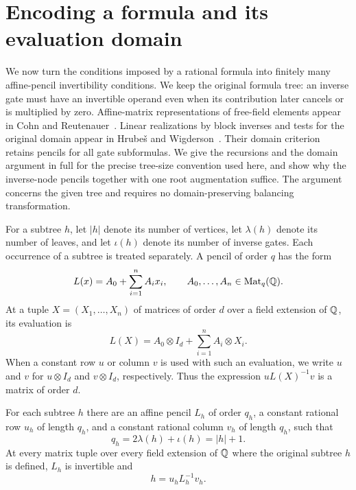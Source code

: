 \section{Encoding a formula and its evaluation domain}
\label{sec:encoding}

We now turn the conditions imposed by a rational formula into finitely many
affine-pencil invertibility conditions.  We keep the original formula tree:
an inverse gate must have an invertible operand even when its contribution
later cancels or is multiplied by zero.
Affine-matrix representations of free-field elements appear in
Cohn and Reutenauer~\citep[Section~3.1]{CR94}.
Linear realizations by block inverses and tests for the original domain
appear in Hrube\v{s} and Wigderson~\citep[Theorem~2.6, Section~6,
and Proposition~7.1]{HW15}. Their domain criterion retains pencils
for all gate subformulas. We give the recursions and the domain
argument in full for the precise tree-size convention used here,
and show why the inverse-node pencils together with one root
augmentation suffice. The argument concerns the given tree and
requires no domain-preserving balancing transformation.

For a subtree $h$, let $|h|$ denote its number of vertices, let $\lambda(h)$
denote its number of leaves, and let $\iota(h)$ denote its number of inverse
gates.  Each occurrence of a subtree is treated separately.  A pencil of
order $q$ has the form
\[
 L(x)=A_0+\sum_{i=1}^n A_i x_i,
 \qquad A_0,\ldots,A_n\in\operatorname{Mat}_q(\mathbb Q).
\]
At a tuple $X=(X_1,\ldots,X_n)$ of matrices of order $d$ over a field
extension of $\mathbb Q$, its evaluation is
\[
 L(X)=A_0\otimes I_d+\sum_{i=1}^n A_i\otimes X_i.
\]
When a constant row $u$ or column $v$ is used with such an evaluation, we
write $u$ and $v$ for $u\otimes I_d$ and $v\otimes I_d$, respectively.
Thus the expression $uL(X)^{-1}v$ is a matrix of order $d$.

\begin{lemma}
\label{lem:formula-realization}
For each subtree $h$ there are an affine pencil $L_h$ of order $q_h$, a
constant rational row $u_h$ of length $q_h$, and a constant rational column
$v_h$ of length $q_h$, such that
\begin{equation}
 q_h=2\lambda(h)+\iota(h)=|h|+1.
 \label{eq:realization-order}
\end{equation}
At every matrix tuple over every field extension of $\mathbb Q$ where the
original subtree $h$ is defined, $L_h$ is invertible and
\begin{equation}
 h=u_hL_h^{-1}v_h.
 \label{eq:realization-invariant}
\end{equation}
\end{lemma}

